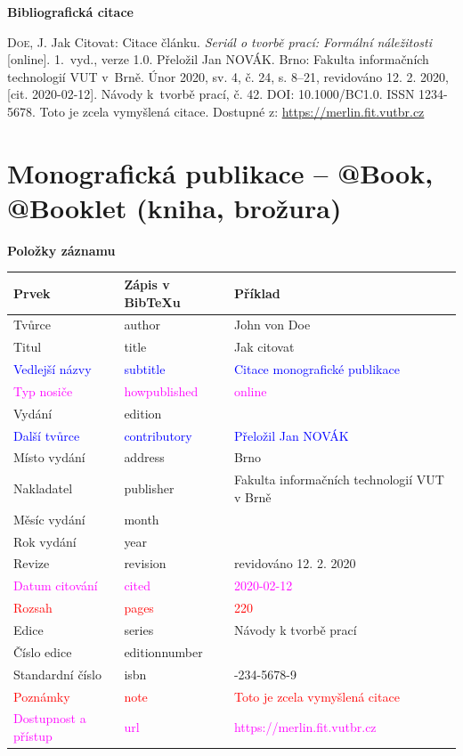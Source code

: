 \bigskip

\noindent \textbf{Bibliografická citace}

\medskip

\noindent \textsc{Doe}, J. Jak Citovat: Citace článku. \textit{Seriál o tvorbě prací: Formální náležitosti} [online]. 1.~vyd., verze 1.0. Přeložil Jan NOVÁK. Brno: Fakulta informačních technologií VUT v~Brně. Únor 2020, sv. 4, č. 24, s. 8–21, revidováno 12. 2. 2020, [cit. 2020-02-12]. Návody k~tvorbě prací, č. 42. DOI: 10.1000/BC1.0. ISSN 1234-5678. Toto je zcela vymyšlená citace. Dostupné z: \url{https://merlin.fit.vutbr.cz}

\newpage
\section*{Monografická publikace -- @Book, @Booklet (kniha, brožura)}
\label{pr-monografie}
\noindent \textbf{Položky záznamu}

\medskip

\begin{tabularx}{0.95\linewidth}{X X >{\raggedright\arraybackslash}X}
    Prvek & Zápis v BibTeXu & Příklad\\\hline
    Tvůrce & author & John von Doe\\
    Titul & title & Jak citovat\\
    \textcolor{blue}{Vedlejší názvy} & \textcolor{blue}{subtitle} & \textcolor{blue}{Citace monografické publikace}\\
    \textcolor{magenta}{Typ nosiče} & \textcolor{magenta}{howpublished} & \textcolor{magenta}{online}\\
    Vydání & edition & 1\\
    \textcolor{blue}{Další tvůrce} & \textcolor{blue}{contributory} & \textcolor{blue}{Přeložil Jan NOVÁK}\\
    Místo vydání & address & Brno\\
    Nakladatel & publisher & Fakulta informačních technologií VUT v Brně\\
    Měsíc vydání & month & 2\\
    Rok vydání & year & 2020\\
    Revize & revision & revidováno 12. 2. 2020\\
    \textcolor{magenta}{Datum citování} & \textcolor{magenta}{cited} & \textcolor{magenta}{2020-02-12}\\
    \textcolor{red}{Rozsah} & \textcolor{red}{pages} & \textcolor{red}{220}\\
    Edice & series & Návody k tvorbě prací\\
    Číslo edice & editionnumber & 2\\
    Standardní číslo & isbn & 01-234-5678-9\\
    \textcolor{red}{Poznámky} & \textcolor{red}{note} & \textcolor{red}{Toto je zcela vymyšlená citace}\\
    \textcolor{magenta}{Dostupnost a přístup} & \textcolor{magenta}{url} & \textcolor{magenta}{https://merlin.fit.vutbr.cz}\\
\end{tabularx}

